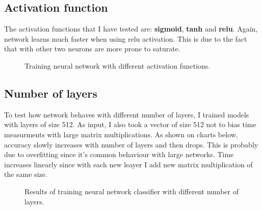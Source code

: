 \documentclass{article}
\begin{document}
\newpage

\subsection{Activation function}
The activation functions that I have tested are: \textbf{sigmoid}, \textbf{tanh} and \textbf{relu}.
Again, network learns much faster when using relu activation. This is due to the fact that with
other two neurons are more prone to saturate.
\begin{figure}[h]	
	\begin{center}
        \caption{Training neural network with different activation functions.}
	\end{center}
\end{figure}

\subsection{Number of layers}
To test how network behaves with different number of layers, I trained models with layers of size 512.
As input, I also took a vector of size 512 not to bias time measurments with large matrix multiplications.
As shown on charts below, accuracy slowly increases with number of layers and then drops. This is probably
due to overfitting since it's common behaviour with large networks. Time increases linearly since with each
new leayer I add new matrix multiplication of the same size. 

\begin{figure}[h]	
	\begin{center}
		\scalebox{0.39}{}
        \caption{Results of training neural network classifier with different number of layers.}
	\end{center}
\end{figure}
\end{document}
